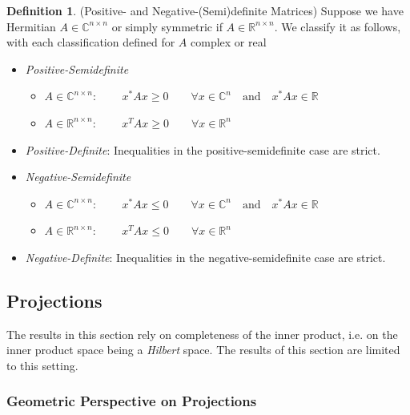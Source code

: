 \documentclass[12pt]{book}
\numberwithin{equation}{section} %
\theoremstyle{plain}
\theoremstyle{definition}
\newtheorem{defn}[thm]{Definition}
\theoremstyle{remark}
\newcommand{\R}{\mathbb{R}}
\newcommand{\C}{\mathbb{C}}
\begin{document}
\begin{defn}{(Positive- and Negative-(Semi)definite Matrices)}
Suppose we have Hermitian $A \in \C^{n\times n}$ or simply
symmetric if $A \in \R^{n\times n}$. We classify it as follows, with
each classification defined for $A$ complex or real
\begin{itemize}
  \item \emph{Positive-Semidefinite}
    \begin{itemize}
      \item $A \in \C^{n\times n}$:
          $\qquad x^* A x \geq 0
          \qquad \forall x\in \C^n
          \quad \text{and} \quad x^* A x\in \R$
      \item $A \in \R^{n\times n}$:
          $\qquad x^T A x\geq 0
          \qquad \forall x\in \R^n$
    \end{itemize}
  \item \emph{Positive-Definite}: Inequalities in the
    positive-semidefinite case are strict.
  \item \emph{Negative-Semidefinite}
    \begin{itemize}
      \item $A \in \C^{n\times n}$:
          $\qquad x^* A x \leq 0
          \qquad \forall x\in \C^n
          \quad \text{and} \quad x^* A x\in \R$
      \item $A \in \R^{n\times n}$:
          $\qquad x^T A x\leq 0
          \qquad \forall x\in \R^n$
    \end{itemize}
  \item \emph{Negative-Definite}: Inequalities in the
    negative-semidefinite case are strict.
\end{itemize}
\end{defn}



\clearpage
\subsection{Projections}

The results in this section rely on completeness of the inner product,
i.e. on the inner product space being a \emph{Hilbert} space.
The results of this section are limited to this setting.

\subsubsection{Geometric Perspective on Projections}
\end{document}
